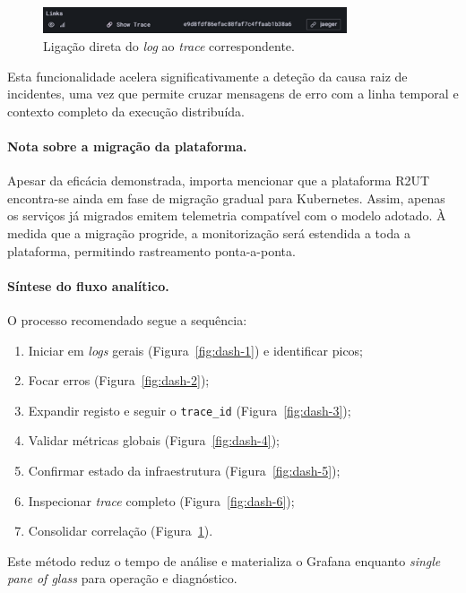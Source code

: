 \begin{figure}[H]
    \centering
    \includegraphics[width=0.8\textwidth]{images/Grafana/trace_link_por_log.png}
    \caption{Ligação direta do \textit{log} ao \textit{trace} correspondente.}
    \label{fig:dash-7}
\end{figure}

Esta funcionalidade acelera significativamente a deteção da causa raiz de incidentes, 
uma vez que permite cruzar mensagens de erro com a linha temporal e contexto completo 
da execução distribuída.

\paragraph{Nota sobre a migração da plataforma.}
Apesar da eficácia demonstrada, importa mencionar que a plataforma R2UT encontra-se ainda 
em fase de migração gradual para Kubernetes. Assim, apenas os serviços já migrados 
emitem telemetria compatível com o modelo adotado. À medida que a migração progride, a 
monitorização será estendida a toda a plataforma, permitindo rastreamento ponta-a-ponta.

\paragraph{Síntese do fluxo analítico.}
O processo recomendado segue a sequência:

\begin{enumerate}
\item Iniciar em \textit{logs} gerais (Figura~\ref{fig:dash-1}) e identificar picos;
\item Focar erros (Figura~\ref{fig:dash-2});
\item Expandir registo e seguir o \texttt{trace\_id} (Figura~\ref{fig:dash-3});
\item Validar métricas globais (Figura~\ref{fig:dash-4});
\item Confirmar estado da infraestrutura (Figura~\ref{fig:dash-5});
\item Inspecionar \textit{trace} completo (Figura~\ref{fig:dash-6});
\item Consolidar correlação (Figura~\ref{fig:dash-7}).
\end{enumerate}

Este método reduz o tempo de análise e materializa o Grafana enquanto \textit{single pane of glass} 
para operação e diagnóstico.


